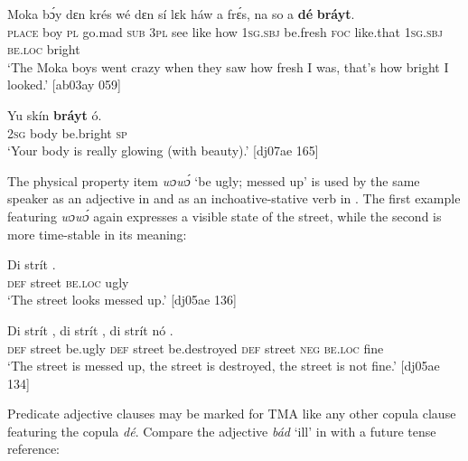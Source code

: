 \ea%
    \label{ex:key:832}
    \gll Moka  bɔ́y  dɛn  krés    wé  dɛn  sí  lɛk  háw    a    frɛ́s,  
na  so    a    \textbf{dé}    \textbf{bráyt}.\\
\textsc{place}  boy  \textsc{pl}  go.mad  \textsc{sub}  \textsc{3pl}  see  like  how    \textsc{1sg.sbj}  be.fresh  
\textsc{foc}  like.that  \textsc{1sg.sbj}  \textsc{be.loc}  bright\\

\glt ‘The Moka boys went crazy when they saw how fresh I was, that’s how bright 
I looked.’ [ab03ay 059]
\z


\ea%
    \label{ex:key:833}
    \gll Yu  skín    \textbf{bráyt}    ó.\\
\textsc{2sg}  body  be.bright    \textsc{sp}\\

\glt ‘Your body is really glowing (with beauty).’ [dj07ae 165]
\z

The physical property item \textit{wɔwɔ́} ‘be ugly; messed up’ is used by the same speaker as an adjective in  and as an inchoative-stative verb in . The first example featuring \textit{wɔwɔ́} again expresses a visible state of the street, while the second is more time-stable in its meaning: 


\ea%
    \label{ex:key:834}
    \gll Di  strít       .\\
\textsc{def}  street  \textsc{be.loc}  ugly\\

\glt ‘The street looks messed up.’ [dj05ae 136]
\z


\ea%
    \label{ex:key:835}
    \gll Di  strít    ,  di  strít    ,      
di  strít    nó      .\\
\textsc{def}  street  be.ugly  \textsc{def}  street  be.destroyed    
\textsc{def}  street  \textsc{neg}  \textsc{be.loc}  fine\\

\glt ‘The street is messed up, the street is destroyed, the street is not fine.’ [dj05ae 134]
\z

Predicate adjective clauses may be marked for \textsc{TMA} like any other copula clause featuring the copula \textit{dé}. Compare the adjective \textit{bád} ‘ill’ in  with a future tense reference:


